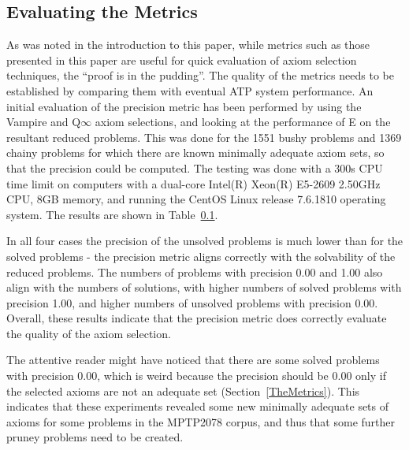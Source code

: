 \documentclass[]{ceurart}
\begin{document}
\subsection{Evaluating the Metrics}
\label{EvaluationOfMetrics}

As was noted in the introduction to this paper, while metrics such as
those presented in this paper are useful for quick evaluation of axiom
selection techniques, the ``proof is in the pudding''.
The quality of the metrics needs to be established by comparing them with 
eventual ATP system performance.
An initial evaluation of the precision metric has been performed by using
the Vampire and Q$\infty$ axiom selections, and looking at the performance 
of E on the resultant reduced problems.
This was done for the 1551 bushy problems and 1369 chainy problems for
which there are known minimally adequate axiom sets, so that the precision 
could be computed.
The testing was done with a 300s CPU time limit on 
computers with a dual-core Intel(R) Xeon(R) E5-2609 2.50GHz CPU,
8GB memory, and running the CentOS Linux release 7.6.1810 operating system.
The results are shown in Table~\ref{EvaluationOfMetrics}.

In all four cases the precision of the unsolved problems is much lower than for 
the solved problems - the precision metric aligns correctly with the solvability 
of the reduced problems.
The numbers of problems with precision 0.00 and 1.00 also align with the numbers
of solutions, with higher numbers of solved problems with precision 1.00, and
higher numbers of unsolved problems with precision 0.00.
Overall, these results indicate that the precision metric does correctly
evaluate the quality of the axiom selection.

The attentive reader might have noticed that there are some solved problems with
precision 0.00, which is weird because the precision should be 0.00 only if the 
selected axioms are not an adequate set (Section~\ref{TheMetrics}).
This indicates that these experiments revealed some new minimally adequate 
sets of axioms for some problems in the MPTP2078 corpus, and thus that some 
further pruney problems need to be created.
\end{document}
